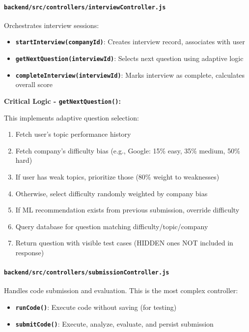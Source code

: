 \documentclass[12pt,a4paper,oneside]{article}
\newcommand{\fileref}[1]{\texttt{#1}}
\newcommand{\funcname}[1]{\texttt{\textbf{#1}}}
\begin{document}
\paragraph{\fileref{backend/src/controllers/interviewController.js}}

Orchestrates interview sessions:

\begin{itemize}
    \item \funcname{startInterview(companyId)}: Creates interview record, associates with user
    \item \funcname{getNextQuestion(interviewId)}: Selects next question using adaptive logic
    \item \funcname{completeInterview(interviewId)}: Marks interview as complete, calculates overall score
\end{itemize}

\textbf{Critical Logic - \funcname{getNextQuestion()}:}

This implements adaptive question selection:

\begin{enumerate}
    \item Fetch user's topic performance history
    \item Fetch company's difficulty bias (e.g., Google: 15\% easy, 35\% medium, 50\% hard)
    \item If user has weak topics, prioritize those (80\% weight to weaknesses)
    \item Otherwise, select difficulty randomly weighted by company bias
    \item If ML recommendation exists from previous submission, override difficulty
    \item Query database for question matching difficulty/topic/company
    \item Return question with visible test cases (HIDDEN ones NOT included in response)
\end{enumerate}

\paragraph{\fileref{backend/src/controllers/submissionController.js}}

Handles code submission and evaluation. This is the most complex controller:

\begin{itemize}
    \item \funcname{runCode()}: Execute code without saving (for testing)
    \item \funcname{submitCode()}: Execute, analyze, evaluate, and persist submission
\end{itemize}
\end{document}

